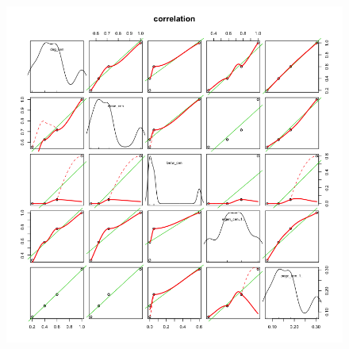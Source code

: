 \documentclass[a4paper]{article}
\begin{document}
\begin{figure}[ht!]
	\centering
	 \label{tab:figure}
	\includegraphics[scale=0.5]{Fig2.png}
\end{figure}
\end{document}

